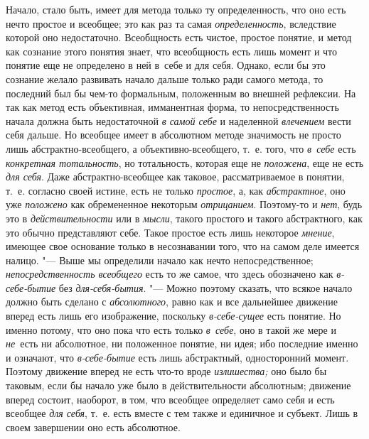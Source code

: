 Начало, стало быть, имеет для метода только ту определенность, что оно
есть нечто простое и всеобщее; это как раз та самая {\em определенность},
вследствие которой оно недостаточно. Всеобщность есть чистое,
простое понятие, и метод как сознание этого понятия знает, что всеобщность
есть лишь момент и что понятие еще не определено в ней в~себе и для себя.
Однако, если бы это сознание желало развивать начало дальше только ради
самого метода, то последний был бы чем-то формальным, положенным во внешней
рефлексии. На так как метод есть объективная, имманентная форма, то
непосредственность начала должна быть недостаточной
{\em в самой себе} и наделенной {\em влечением}
вести себя дальше. Но всеобщее имеет в абсолютном методе
значимость не просто лишь абстрактно-всеобщего, а объективно-всеобщего,
т.~е. того, что {\em в~себе} есть {\em конкретная
тотальность}, но тотальность, которая еще не
{\em положена}, еще не есть {\em для себя}. Даже
абстрактно-всеобщее как таковое, рассматриваемое в понятии, т.~е. согласно
своей истине, есть не только {\em простое}, а, как {\em абстрактное}, оно
уже {\em положено} как обремененное некоторым {\em отрицанием}.
Поэтому-то и {\em нет}, будь это в {\em действительности} или в {\em мысли},
такого простого и такого абстрактного, как это обычно
представляют себе. Такое простое есть лишь некоторое {\em мнение}, имеющее
свое основание только в несознавании того, что на самом деле имеется
налицо. "--- Выше мы определили начало как нечто непосредственное;
{\em непосредственность всеобщего}
есть то же самое, что здесь обозначено как
{\em в-себе-бытие} без {\em для-себя-бытия}. "--- Можно поэтому
сказать, что всякое начало должно быть сделано с {\em абсолютного},
равно как и все дальнейшее движение вперед есть лишь его
изображение, поскольку {\em в-себе-сущее} есть
понятие. Но именно потому, что оно пока что есть только
{\em в~себе}, оно в такой же мере и {\em не}~есть
ни абсолютное, ни положенное понятие, ни идея; ибо последние именно и
означают, что {\em в-себе-бытие}
есть лишь абстрактный, односторонний момент. Поэтому движение
вперед не есть что-то вроде {\em излишества;} оно
было бы таковым, если бы начало уже было в действительности абсолютным;
движение вперед состоит, наоборот, в том, что всеобщее определяет само себя
и есть всеобщее {\em для себя},
т.~е. есть вместе с тем также и единичное и субъект. Лишь в
своем завершении оно есть абсолютное.

